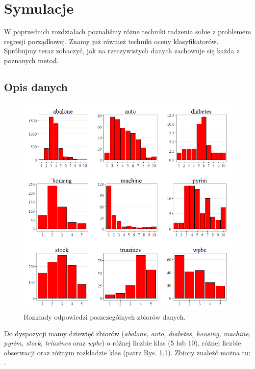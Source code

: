 \documentclass{mini}
\begin{document}
\chapter{Symulacje}

W poprzednich rozdziałach poznaliśmy różne techniki radzenia sobie z problemem regresji porządkowej. Znamy już również techniki oceny klasyfikatorów. Spróbujmy teraz zobaczyć, jak na rzeczywistych danych zachowuje się każda z poznanych metod. 

\section{Opis danych}

\begin{figure}[h!t]
\begin{center}
\includegraphics[scale=0.6]{graphics/rozklad_odpowiedzi.png}
\end{center}
\caption{Rozkłady odpowiedzi poszczególnych zbiorów danych.}
\label{rozkladdanych}
\end{figure}

Do dyspozycji mamy dziewięć zbiorów (\textit{abalone, auto, diabetes, housing, machine, pyrim, stock, triazines} oraz \textit{wpbc}) o różnej liczbie klas ($5$ lub $10$), różnej liczbie obserwacji oraz różnym rozkładzie klas (patrz Rys. \ref{rozkladdanych}). Zbiory znaleźć można tu: \cite{zbiorki}. 
\end{document}
